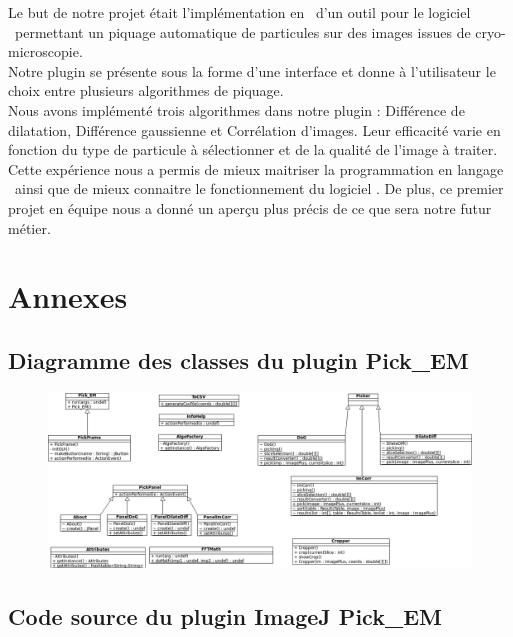 \documentclass[12pt,a4paper]{report}
\begin{document}

Le but de notre projet était l'implémentation en \java ~d'un outil pour le logiciel \imj ~permettant un piquage automatique de particules sur des images issues de cryo-microscopie. \\
Notre plugin se présente sous la forme d'une interface et donne à l'utilisateur le choix entre plusieurs algorithmes de piquage. \\
Nous avons implémenté trois algorithmes dans notre plugin : Différence de dilatation, Différence gaussienne et Corrélation d'images. Leur efficacité varie en fonction du type de particule à sélectionner et de la qualité de l'image à traiter. \\

Cette expérience nous a permis de mieux maitriser la programmation en langage \java ~ainsi que de mieux connaitre le fonctionnement du logiciel \imj. De plus, ce premier projet en équipe nous a donné un aperçu plus précis de ce que sera notre futur métier. 





\appendix
\chapter{Annexes}


\newpage

\section{Diagramme des classes du plugin Pick\_EM}

\begin{figure}[!ht] 
\begin{center}
\includegraphics[width=1.4\textwidth, angle=90]{diagComplet.png}
\end{center}
\end{figure}
\section{Code source du plugin ImageJ Pick\_EM}
\end{document}
